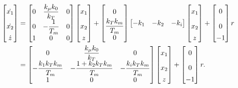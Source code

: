 \documentclass[12pt]{article}
\begin{document}
\begin{align*}
    \begin{bmatrix}
        \dot{x_1}\vphantom{\dfrac{1}{0_0}} \\ 
        \dot{x_2}\vphantom{\dfrac{1}{0_0}}\\
        \dot{z}    
    \end{bmatrix}
     &= \begin{bmatrix}
        0 & \dfrac{k_\mu k_0}{k_T } & 0 \\
        0 & -\dfrac{1}{T_m} & 0 \\
        1 & 0 & 0
\end{bmatrix}
    \begin{bmatrix}
        x_1  \vphantom{\dfrac{1}{0_0}}\\
        x_2 \vphantom{\dfrac{1}{0_0}}\\
        z
    \end{bmatrix}
+ \begin{bmatrix}
        0\vphantom{\dfrac{0}{1}} \\
        \dfrac{k_T k_m }{T_m }  \\
        0 
\end{bmatrix} 
    \begin{bmatrix}
        -k_1 & -k_2 & -k_i
    \end{bmatrix}
    \begin{bmatrix}
        x_1  \vphantom{\dfrac{1}{0_0}}\\
        x_2 \vphantom{\dfrac{1}{0_0}}\\
        z
    \end{bmatrix}
    + 
    \begin{bmatrix}
        0  \vphantom{\dfrac{1}{0_0}}\\
        0 \vphantom{\dfrac{1}{0_0}}\\
        -1
    \end{bmatrix} r \\
    &= \begin{bmatrix}
        0 & \dfrac{k_\mu k_0}{k_T } & 0 \\
        -\dfrac{k_ 1 k_T k_m }{T_m } & -\dfrac{1 + k_2 k_T k_m }{T_m} & -\dfrac{k_i k_T k_m }{T_m } \\
        1 & 0 & 0
\end{bmatrix}
    \begin{bmatrix}
        x_1  \vphantom{\dfrac{1}{0_0}}\\
        x_2 \vphantom{\dfrac{1}{0_0}}\\
        z
    \end{bmatrix}
    + 
    \begin{bmatrix}
        0  \vphantom{\dfrac{1}{0_0}}\\
        0 \vphantom{\dfrac{1}{0_0}}\\
        -1
    \end{bmatrix} r.
\end{align*} 
\end{document}
